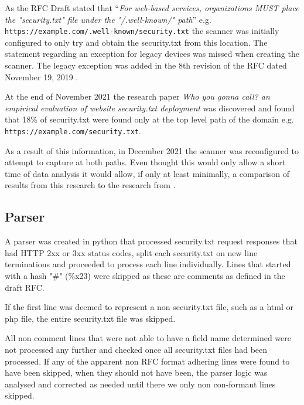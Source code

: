 \documentclass{mscreport}
\begin{document}
\vspace{0.3cm} \noindent
As the RFC Draft stated that ``\textit{For web-based services, organizations MUST place the "security.txt" file under the "/.well-known/" path}'' \cite{Foudil2021-vh} e.g. \newline \texttt{https://example.com/.well-known/security.txt} the scanner was initially configured to only try and obtain the security.txt from this location. The statement regarding an exception for legacy devices was missed when creating the scanner. The legacy exception was added in the 8th revision of the RFC dated November 19, 2019 \cite{Foudil2021-vh}.

\vspace{0.3cm} \noindent
At the end of November 2021 the research paper \textit{Who you gonna call? an empirical evaluation of website security.txt deployment} \cite{Poteat2021-zr} was discovered and found that 18\% of security.txt were found only at the top level path of the domain e.g. \newline \texttt{https://example.com/security.txt}.

\vspace{0.3cm} \noindent
As a result of this information, in December 2021 the scanner was reconfigured to attempt to capture at both paths. Even thought this would only allow a short time of data analysis it would allow, if only at least minimally, a comparison of results from this research to the research from \cite{Poteat2021-zr}.

\subsection{Parser}

A parser was created in python that processed security.txt request responses that had HTTP 2xx or 3xx status codes, split each security.txt on new line terminations and proceeded to process each line individually. Lines that started with a hash "\#" (\%x23) were skipped as these are comments as defined in the draft RFC.

\vspace{0.3cm} \noindent
If the first line was deemed to represent a non security.txt file, such as a html or php file, the entire security.txt file was skipped.

\vspace{0.3cm} \noindent
All non comment lines that were not able to have a field name determined were not processed any further and checked once all security.txt files had been processed. If any of the apparent non RFC format adhering lines were found to have been skipped, when they should not have been, the parser logic was analysed and corrected as needed until there we only non con-formant lines skipped.
\end{document}

